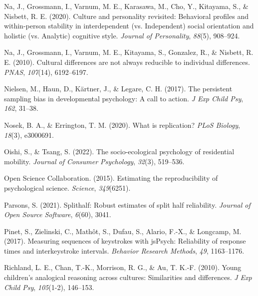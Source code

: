 \documentclass[
  man,floatsintext]{apa6}
\newlength{\cslhangindent}
\newlength{\cslentryspacingunit} %
\newenvironment{CSLReferences}[2] %
 {%
  \setlength{\parindent}{0pt}
  \ifodd #1
  \let\oldpar\par
  \def\par{\hangindent=\cslhangindent\oldpar}
  \fi
  \setlength{\parskip}{#2\cslentryspacingunit}
 }%
 {}
\begin{document}
\begin{CSLReferences}{1}{0}
\leavevmode{}%
Na, J., Grossmann, I., Varnum, M. E., Karasawa, M., Cho, Y., Kitayama, S., \& Nisbett, R. E. (2020). Culture and personality revisited: Behavioral profiles and within-person stability in interdependent (vs. Independent) social orientation and holistic (vs. Analytic) cognitive style. \emph{Journal of Personality}, \emph{88}(5), 908--924.

\leavevmode{}%
Na, J., Grossmann, I., Varnum, M. E., Kitayama, S., Gonzalez, R., \& Nisbett, R. E. (2010). Cultural differences are not always reducible to individual differences. \emph{PNAS}, \emph{107}(14), 6192--6197.

\leavevmode{}%
Nielsen, M., Haun, D., Kärtner, J., \& Legare, C. H. (2017). The persistent sampling bias in developmental psychology: A call to action. \emph{J Exp Child Psy}, \emph{162}, 31--38.

\leavevmode{}%
Nosek, B. A., \& Errington, T. M. (2020). What is replication? \emph{PLoS Biology}, \emph{18}(3), e3000691.

\leavevmode{}%
Oishi, S., \& Tsang, S. (2022). The socio-ecological psychology of residential mobility. \emph{Journal of Consumer Psychology}, \emph{32}(3), 519--536.

\leavevmode{}%
Open Science Collaboration. (2015). Estimating the reproducibility of psychological science. \emph{Science}, \emph{349}(6251).

\leavevmode{}%
Parsons, S. (2021). Splithalf: Robust estimates of split half reliability. \emph{Journal of Open Source Software}, \emph{6}(60), 3041.

\leavevmode{}%
Pinet, S., Zielinski, C., Mathôt, S., Dufau, S., Alario, F.-X., \& Longcamp, M. (2017). Measuring sequences of keystrokes with jsPsych: Reliability of response times and interkeystroke intervals. \emph{Behavior Research Methods}, \emph{49}, 1163--1176.

\leavevmode{}%
Richland, L. E., Chan, T.-K., Morrison, R. G., \& Au, T. K.-F. (2010). Young children's analogical reasoning across cultures: Similarities and differences. \emph{J Exp Child Psy}, \emph{105}(1-2), 146--153.


\end{CSLReferences}
\end{document}
